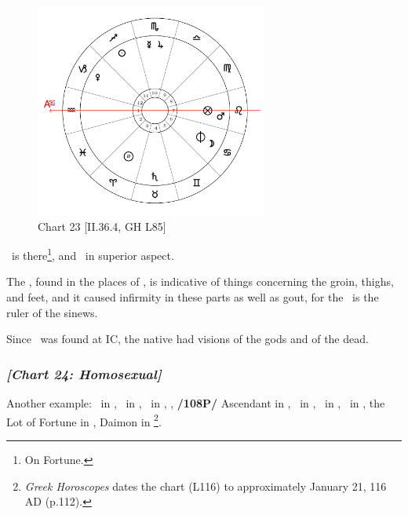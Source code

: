 \clearpage
\begin{figure}
\centering
\vspace{-20pt}
\includegraphics[width=0.68\textwidth]{charts/2_36_4}
\caption{Chart 23 [II.36.4, GH L85]}
\label{fig:chart23}
\end{figure}

\noindent \Mars\, is there\footnote{On Fortune.}, and \Saturn\, in superior aspect.

The \Sun, found in the places of \Jupiter, is indicative of things
concerning the groin, thighs, and feet, and it caused infirmity in these parts as well as gout, for the \Sun\, is the ruler of the sinews.

Since \Saturn\, was found at IC, the native had visions of the gods and of the dead.

\newpage
\clearpage
\subsubsection{\textit{[Chart 24: Homosexual]}}
Another example: \Sun\, in \Aquarius, \Moon\, in \Virgo, \Saturn\, in \Taurus, \Jupiter, \textbf{/108P/} Ascendant in \Gemini, \Mars\, in \Cancer, \Venus\, in \Pisces, \Mercury\, in \Capricorn, the Lot of Fortune in \Capricorn, Daimon in \Scorpio
\footnote{\textit{Greek Horoscopes} dates the chart (L116) to approximately January 21, 116 AD (p.112).}.

